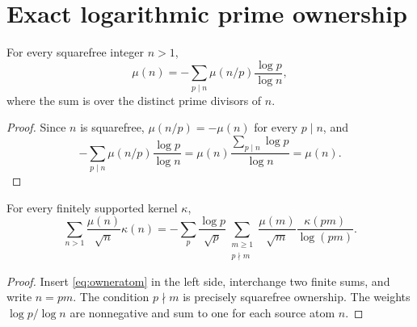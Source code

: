 \section{Exact logarithmic prime ownership}

\begin{lemma}\label{lem:owneratom}
For every squarefree integer $n>1$,
\begin{equation}\label{eq:owneratom}
 \mu(n)= -\sum_{p\mid n}\mu(n/p)\frac{\log p}{\log n},
\end{equation}
where the sum is over the distinct prime divisors of $n$.
\end{lemma}
\begin{proof}
Since $n$ is squarefree, $\mu(n/p)=-\mu(n)$ for every $p\mid n$, and
\[
 -\sum_{p\mid n}\mu(n/p)\frac{\log p}{\log n}
 =\mu(n)\frac{\sum_{p\mid n}\log p}{\log n}=\mu(n).
\]
\end{proof}

\begin{theorem}\label{thm:owner}
For every finitely supported kernel $\kappa$,
\begin{equation}\label{eq:owner}
\sum_{n>1}\frac{\mu(n)}{\sqrt n}\kappa(n)
=-\sum_p\frac{\log p}{\sqrt p}
 \sum_{\substack{m\ge1\\p\nmid m}}
 \frac{\mu(m)}{\sqrt m}\frac{\kappa(pm)}{\log(pm)}.
\end{equation}
\end{theorem}
\begin{proof}
Insert \eqref{eq:owneratom} in the left side, interchange two finite sums, and
write $n=pm$.  The condition $p\nmid m$ is precisely squarefree ownership.
The weights $\log p/\log n$ are nonnegative and sum to one for each source
atom $n$.
\end{proof}

